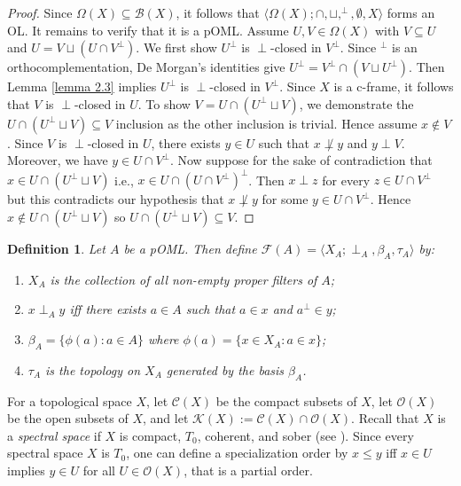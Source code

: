 \documentclass[10pt,a4paper]{amsart}
\newtheorem{definition}[theorem]{Definition}
\begin{document}
    \begin{proof}
Since $\Omega(X)\subseteq\mathcal{B}(X)$, it follows that $\langle\Omega(X);\cap,\sqcup,^{\perp},\emptyset,X\rangle$ forms an OL. It remains to verify that it is a pOML. Assume $U,V\in\Omega(X)$ with $V\subseteq U$ and $U=V\sqcup(U\cap V^{\perp})$. We first show $U^{\perp}$ is $\perp$-closed in $V^{\perp}$. Since $^{\perp}$ is an orthocomplementation, De Morgan's identities give $U^{\perp}=V^{\perp}\cap(V\sqcup U^{\perp})$. Then Lemma \ref{lemma 2.3} implies $U^{\perp}$ is $\perp$-closed in $V^{\perp}$. Since $X$ is a c-frame, it follows that $V$ is $\perp$-closed in $U$. To show $V=U\cap(U^{\perp}\sqcup V)$, we demonstrate the $U\cap(U^{\perp}\sqcup V)\subseteq V$ inclusion as the other inclusion is trivial. Hence assume $x\not\in V$. Since $V$ is $\perp$-closed in $U$, there exists $y\in U$ such that $x\not\perp y$ and $y\perp V$. Moreover, we have $y\in U\cap V^{\perp}$. Now suppose for the sake of contradiction that $x\in U\cap(U^{\perp}\sqcup V)$ i.e., $x\in U\cap(U\cap V^{\perp})^{\perp}$. Then $x\perp z$ for every $z\in U\cap V^{\perp}$ but this contradicts our hypothesis that $x\not\perp y$ for some $y\in U\cap V^{\perp}$. Hence $x\not\in U\cap(U^{\perp}\sqcup V)$ so $U\cap(U^{\perp}\sqcup V)\subseteq V$.  
\end{proof} 
\begin{definition}
    Let $A$ be a pOML. Then define $\mathcal{F}(A)=\langle X_A;\perp_A,\beta_A,\tau_A\rangle$ by: 
    \begin{enumerate}
        \item $X_A$ is the collection of all non-empty proper filters of $A$; 
        \item $x\perp_A y$ iff there exists $a\in A$ such that $a\in x$ and $a^{\perp}\in y$; 
        \item $\beta_A=\{\phi(a):a\in A\}$ where $\phi(a)=\{x\in X_A:a\in x\}$; 
        \item $\tau_A$ is the topology on $X_A$ generated by the basis $\beta_A$. 
    \end{enumerate}
\end{definition}
For a topological space $X$, let $\mathcal{C}(X)$ be the compact subsets of $X$, let $\mathcal{O}(X)$ be the open subsets of $X$, and let $\mathcal{K}(X):=\mathcal{C}(X)\cap\mathcal{O}(X)$. Recall that $X$ is a \emph{spectral space} if $X$ is compact, $T_0$, coherent, and sober (see \cite[Section 3.2]{mcdonald}). Since every spectral space $X$ is $T_0$, one can define a specialization order by $x\leqslant y$ iff $x\in U$ implies $y\in U$ for all $U\in\mathcal{O}(X)$, that is a partial order.  
\end{document}
